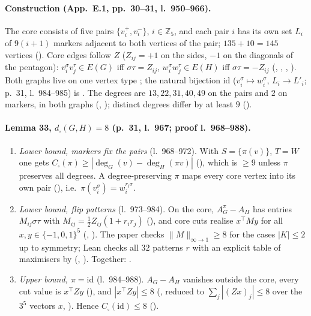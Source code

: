 \paragraph{Construction (App.~E.1, pp.~30--31, l.~950--966).} The core consists of five pairs $\{v_i^+,v_i^-\}$, $i\in\mathbb Z_5$, and each pair $i$
has its own set $L_i$ of $9(i+1)$ markers adjacent to both vertices of the pair; $135+10=145$ vertices
(). Core edges follow $Z$ ($Z_{ij}=+1$ on the sides, $-1$ on the diagonals of the pentagon):
$v^\sigma_iv^\tau_j\in E(G)$ iff $\sigma\tau=Z_{ij}$, $w^\sigma_iw^\tau_j\in E(H)$ iff $\sigma\tau=-Z_{ij}$
(, , , ). Both graphs live on one vertex type ; the natural
bijection $\mathrm{id}$ ($v_i^\sigma\mapsto w_i^\sigma$, $L_i\to L'_i$; p.~31, l.~984--985) is . The degrees are $13,22,31,40,49$ on the pairs and $2$ on markers, in both
graphs (, ); distinct degrees differ by at least $9$ ().

\paragraph{Lemma 33, $d_\square(G,H)=8$ (p.~31, l.~967; proof l.~968--988).}
\begin{enumerate}
\item \emph{Lower bound, markers fix the pairs} (l.~968--972). With $S=\{\pi(v)\}$, $T=W$ one gets
$C_\square(\pi)\ge|\deg_G(v)-\deg_H(\pi v)|$ (), which is $\ge9$ unless $\pi$ preserves all degrees.
A degree-preserving $\pi$ maps every core vertex into its own pair (), i.e.\ $\pi(v_i^\sigma)=w_i^{r_i\sigma}$.
\item \emph{Lower bound, flip patterns} (l.~973--984). On the core, $A^\pi_G-A_H$ has entries $M_{ij}\sigma\tau$ with
$M_{ij}=\frac12Z_{ij}(1+r_ir_j)$ (), and core cuts realise $x^\top My$ for all $x,y\in\{-1,0,1\}^5$
(, ). The paper checks $\|M\|_{\infty\to1}\ge8$ for the cases $|K|\le2$ up to
symmetry; Lean checks all $32$ patterns $r$ with an explicit table of maximisers  by 
(, ). Together: .
\item \emph{Upper bound, $\pi=\mathrm{id}$} (l.~984--988). $A_G-A_H$ vanishes outside the core, every cut value is $x^\top Zy$
(), and $|x^\top Zy|\le8$ (, reduced to $\sum_j|(Zx)_j|\le8$ over the $3^5$
vectors $x$, ). Hence $C_\square(\mathrm{id})\le8$ ().
\end{enumerate}

